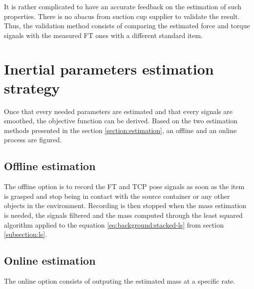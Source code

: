 \documentclass[/home/francois/latex/report/main.tex]{subfiles}
\begin{document}
It is rather complicated to have an accurate feedback on the estimation of such properties. There is no abacus from suction cup supplier to validate the result. Thus, the validation method consists of comparing the estimated force and torque signals with the measured \ac{FT} ones with a different standard item.

\section{Inertial parameters estimation strategy}

Once that every needed parameters are estimated and that every signals are smoothed, the objective function can be derived. Based on the two estimation methods presented in the section \ref{section:estimation}, an offline and an online process are figured.

\subsection{Offline estimation}

The offline option is to record the \ac{FT} and \ac{TCP} pose signals as soon as the item is grasped and stop being in contact with the source container or any other objects in the environment. Recording is then stopped when the mass estimation is needed, the signals filtered and the mass computed through the least squared algorithm applied to the equation \ref{eq:background:stacked-ls} from section \ref{subsection:ls}.

\subsection{Online estimation}

The online option consists of outputing the estimated mass at a specific rate.
\end{document}

